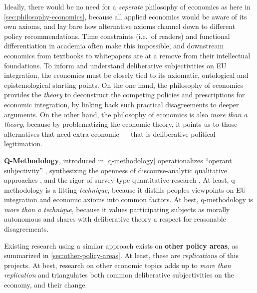 \documentclass[11pt,a4paper,oneside,english]{article}
\begin{document}
Ideally, there would be no need for a \emph{seperate} philosophy of economics as here in \autoref{sec:philosophy-economics}, because all applied economics would be aware of its own axioms, and lay bare how alternative axioms channel down to different policy recommendations.
Time constraints (i.e.\ of readers) and functional differentiation in academia often make this impossible, and downstream economics from textbooks to whitepapers are at a remove from their intellectual foundations.
To inform and understand deliberative subjectivities on EU integration, the economics must be closely tied to its axiomatic, ontological and epistemological starting points.
On the one hand, the philosophy of economics provides the \emph{theory} to deconstruct the competing policies and prescriptions for economic integration, by linking back such practical disagreements to deeper arguments.
On the other hand, the philosophy of economics is also \emph{more than a theory}, because by problematizing the economic theory, it points us to those alternatives that need extra-economic --- that is deliberative-political --- legitimation.

\textbf{Q-Methodology}, introduced in \ref{q-methodology} operationalizes ``operant subjectivity'' \parencite{Stephenson1935,Stephenson1936,Stephenson1977}, synthesizing the openness of discourse-analytic qualitative approaches \parencite{Willig-2003-aa,Foucault-1972-aa,meyer_methods_2012}, and the rigor of survey-type quantitative research \parencite{Sartori-1991-aa}.
At least, q-methodology is a fitting \emph{technique}, because it distills peoples viewpoints on EU integration and economic axioms into common factors.
At best, q-methodology is \emph{more than a technique}, because it values participating subjects as morally autonomous and shares with deliberative theory a respect for reasonable disagreements.

Existing research using a similar approach exists on \textbf{other policy areas}, as summarized in \autoref{sec:other-policy-areas}.
At least, these are \emph{replications} of this projects.
At best, research on other economic topics adds up to \emph{more than replication} and triangulates both common deliberative subjectivities on the economy, and their change.
\end{document}
